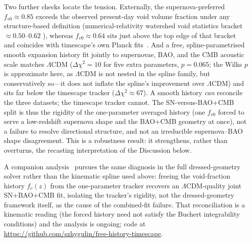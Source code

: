 \documentclass[aps,prd,twocolumn,nofootinbib,superscriptaddress,floatfix]{revtex4-2}
\newcommand{\fvo}{f_{v0}}
\newcommand{\Lcdm}{\Lambda\mathrm{CDM}}
\begin{document}
Two further checks locate the tension. Externally, the supernova-preferred $\fvo\approx0.85$
exceeds the observed present-day void volume fraction under any structure-based definition
(numerical-relativity watershed void statistics bracket $\approx0.50$--$0.62$
\cite{Williams2024}), whereas $\fvo\approx0.64$ sits just above the top edge of that
bracket and coincides with timescape's own Planck fits~\cite{Nazer2015}. And a free, spline-parametrised smooth expansion
history fit jointly to supernovae, BAO, and the CMB acoustic scale matches $\Lcdm$
($\Delta\chi^{2}=10$ for five extra parameters, $p=0.065$; the Wilks $p$ is approximate
here, as $\Lcdm$ is not nested in the spline family, but conservatively so---it does not
inflate the spline's improvement over $\Lcdm$) and sits far below the timescape
tracker ($\Delta\chi^{2}\approx67$). A smooth history \emph{can} reconcile the three datasets;
the timescape tracker cannot. The SN-versus-BAO$+$CMB split is thus the rigidity of the
one-parameter averaged history (one $\fvo$ forced to serve a low-redshift supernova shape and the
BAO$+$CMB geometry at once), not a failure to resolve directional structure, and not an
irreducible supernova--BAO shape disagreement. This is a robustness result: it strengthens, rather
than overturns, the recasting interpretation of the Discussion below.

A companion analysis~\cite{FreeHistory2025} pursues the same diagnosis in the full
dressed-geometry solver rather than the kinematic spline used above: freeing the
void-fraction history $f_v(z)$ from the one-parameter tracker recovers an
$\Lcdm$-quality joint SN$+$BAO$+$CMB fit, isolating the tracker's rigidity, not the
dressed-geometry framework itself, as the cause of the combined-fit failure. That
reconciliation is a kinematic reading (the forced history need not satisfy the
Buchert integrability conditions) and the analysis is ongoing; code at
\url{https://github.com/szhygulin/free-history-timescape}.
\end{document}
